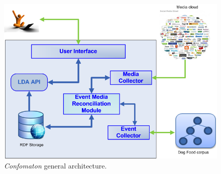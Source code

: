 \begin{figure}[t!h]
 \centering
 \includegraphics[scale=0.35]{img/architecture.png}
 \caption{\emph{Confomaton} general architecture.}
 \label{fig:architecture}
\end{figure}


